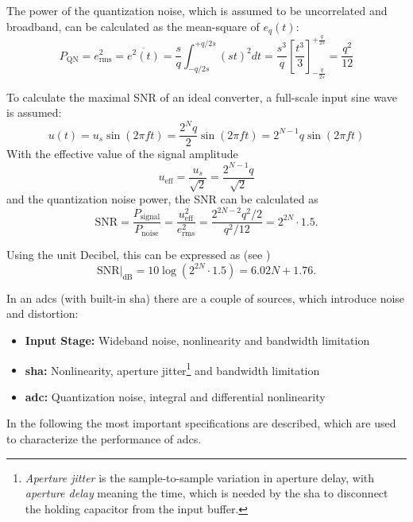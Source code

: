 The power of the quantization noise, which is assumed to be uncorrelated and broadband, can be calculated as the mean-square of $e_q(t)$:
\begin{equation}
	P_\text{QN} = e_{\text{rms}}^{2} = \overline{e^{2}(t)} = \frac{s}{q}\int_{-q/2s}^{+q/2s} (st)^{2} dt = \frac{s^3}{q} \left[ \frac{t^3}{3}\right]_{-\frac{q}{2s}}^{+\frac{q}{2s}} = \frac{q^2}{12}
\end{equation}

To calculate the maximal SNR of an ideal converter, a full-scale input sine wave is assumed:
\begin{equation}
	u(t) = u_s \sin(2\pi f t) = \frac{2^{N}q}{2}\sin(2\pi f t)  = 2^{N-1}q \sin(2\pi f t)
\end{equation}
With the effective value of the signal amplitude
\begin{equation}
	u_{\text{eff}} = \frac{u_s}{\sqrt{2}} = \frac{2^{N-1}q}{\sqrt{2}}
\end{equation}
and the quantization noise power, the SNR can be calculated as
\begin{equation}
	\text{SNR} = \frac{P_{\text{signal}}}{P_{\text{noise}}} = \frac{u_{\text{eff}}^{2}}{e_{\text{rms}}^{2}} = \frac{2^{2N-2}q^2/2}{q^2/12} = 2^{2N} \cdot 1.5.
\end{equation}

Using the unit Decibel, this can be expressed as (see \cite{puente2015,walt})
\begin{equation}
	\text{SNR}|_{\text{dB}} = 10\log\left(2^{2N}\cdot 1.5\right) = 6.02 N + 1.76.
\end{equation}









In an \glspl{adc} (with built-in \gls{sha}) there are a couple of sources, which introduce noise and distortion:
\begin{itemize}
	\item \textbf{Input Stage:} Wideband noise, nonlinearity and bandwidth limitation
	\item \textbf{\gls{sha}:} Nonlinearity, aperture jitter\footnote{\textit{Aperture jitter} is the sample-to-sample variation in aperture delay, with \textit{aperture delay} meaning the time, which is needed by the \gls{sha} to disconnect the holding capacitor from the input buffer.} and bandwidth limitation
	\item \textbf{\gls{adc}:} Quantization noise, integral and differential nonlinearity
\end{itemize}
In the following the most important specifications are described, which are used to characterize the performance of \glspl{adc}.



